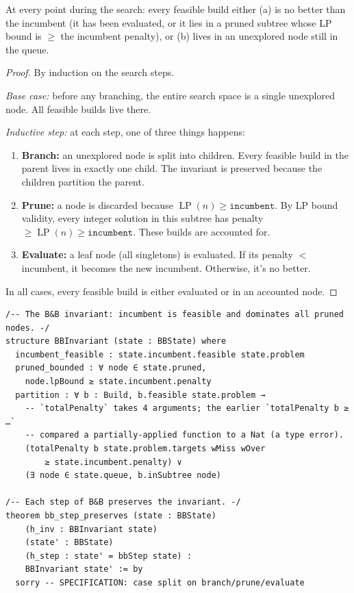 \documentclass[11pt, a4paper, oneside]{book}
\newcommand{\LP}{\operatorname{LP}}
\begin{document}
\begin{lembox}[title={B\&B Invariant Preservation}]
At every point during the search: every feasible build either (a) is no
better than the incumbent (it has been evaluated, or it lies in a pruned subtree
whose LP bound is $\geq$ the incumbent penalty), or (b) lives in an unexplored
node still in the queue.
\end{lembox}

\begin{proof}
By induction on the search steps.

\emph{Base case:} before any branching, the entire search space is a single
unexplored node.  All feasible builds live there.

\emph{Inductive step:} at each step, one of three things happens:
\begin{enumerate}[nosep]
  \item \textbf{Branch:} an unexplored node is split into children.
    Every feasible build in the parent lives in exactly one child.
    The invariant is preserved because the children partition the parent.
  \item \textbf{Prune:} a node is discarded because $\LP(n) \geq
    \texttt{incumbent}$.  By LP bound validity, every integer solution
    in this subtree has penalty $\geq \LP(n) \geq \texttt{incumbent}$.
    These builds are accounted for.
  \item \textbf{Evaluate:} a leaf node (all singletons) is evaluated.
    If its penalty $<$ incumbent, it becomes the new incumbent.  Otherwise,
    it's no better.
\end{enumerate}
In all cases, every feasible build is either evaluated or in an accounted
node.
\end{proof}

\begin{leanbox}[title={Lean 4 (Mathlib) --- B\&B Invariant (specification)}]
\begin{verbatim}
/-- The B&B invariant: incumbent is feasible and dominates all pruned nodes. -/
structure BBInvariant (state : BBState) where
  incumbent_feasible : state.incumbent.feasible state.problem
  pruned_bounded : ∀ node ∈ state.pruned,
    node.lpBound ≥ state.incumbent.penalty
  partition : ∀ b : Build, b.feasible state.problem →
    -- `totalPenalty` takes 4 arguments; the earlier `totalPenalty b ≥ …`
    -- compared a partially-applied function to a Nat (a type error).
    (totalPenalty b state.problem.targets wMiss wOver
        ≥ state.incumbent.penalty) ∨
    (∃ node ∈ state.queue, b.inSubtree node)

/-- Each step of B&B preserves the invariant. -/
theorem bb_step_preserves (state : BBState)
    (h_inv : BBInvariant state)
    (state' : BBState)
    (h_step : state' = bbStep state) :
    BBInvariant state' := by
  sorry -- SPECIFICATION: case split on branch/prune/evaluate
\end{verbatim}
\end{leanbox}
\end{document}
